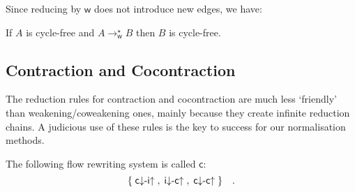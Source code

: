 \documentclass[a4paper]{LMCS}
\begin{document}
Since reducing by ${{\mathsf w}}$ does not introduce new edges, we have:

\begin{prop}\label{PropWLF}
If $A$ is cycle-free and $A\to_{{\mathsf w}}^\star B$ then $B$ is cycle-free.
\end{prop}

\subsection{Contraction and Cocontraction}\label{SubsContr}

The reduction rules for contraction and cocontraction are much less `friendly' than weakening/coweakening ones, mainly because they create infinite reduction chains. A judicious use of these rules is the key to success for our normalisation methods.

\begin{defi}
The following flow rewriting system is called ${{\mathsf c}}$:
\[
\{\;{{{\mathsf c}{\downarrow}{\hbox{-}}{\mathsf i}{\uparrow  }}}\;,\;{{{\mathsf i}{\downarrow}{\hbox{-}}{\mathsf c}{\uparrow  }}}\;,\;{{{\mathsf c}{\downarrow}{\hbox{-}}{\mathsf c}{\uparrow  }}}\;\}\quad.
\]
\end{defi}
\end{document}
